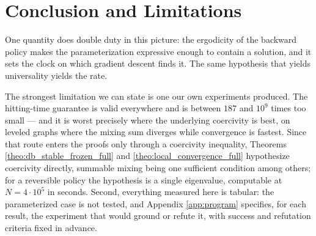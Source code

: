 \section{Conclusion and Limitations}\label{sec:conclusion}

One quantity does double duty in this picture: the ergodicity of the backward policy makes the
parameterization expressive enough to contain a solution, and it sets the clock on which
gradient descent finds it. The same hypothesis that yields universality yields the rate.

The strongest limitation we can state is one our own experiments produced. The hitting-time
guarantee is valid everywhere and is between $187$ and $10^{9}$ times too small --- and it is
worst precisely where the underlying coercivity is best, on leveled graphs where the mixing
sum diverges while convergence is fastest. Since that route enters the proofs only through a
coercivity inequality, Theorems \ref{theo:db_stable_frozen_full} and
\ref{theo:local_convergence_full} hypothesize coercivity directly, summable mixing being one
sufficient condition among others; for a reversible policy the hypothesis is a single
eigenvalue, computable at $N=4\cdot10^5$ in seconds. Second, everything measured here
is tabular: the parameterized case is not tested, and Appendix \ref{app:program} specifies,
for each result, the experiment that would ground or refute it, with success and refutation
criteria fixed in advance.
